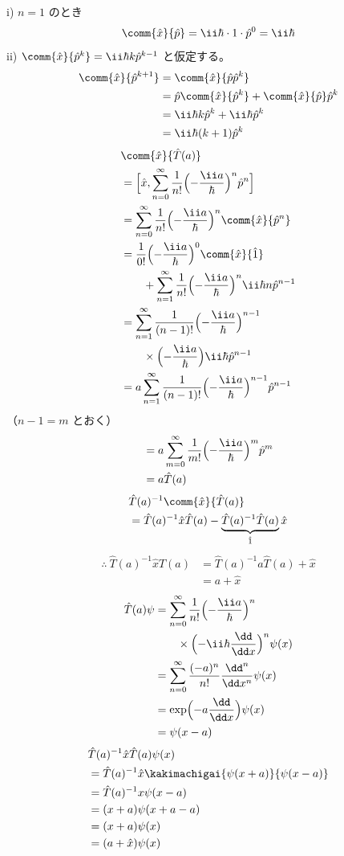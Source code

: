 i) $n=1$ のとき
\[ \comm{\hat{x}}{\hat{p}}=\ii\hbar\cdot1\cdot\hat{p}^{0}=\ii\hbar \]
ii) $\comm{\hat{x}}{\hat{p}^{k}}=\ii\hbar k\hat{p}^{k-1}$ と仮定する。
\begin{align*}
\comm{\hat{x}}{\hat{p}^{k+1}}&=\comm{\hat{x}}{\hat{p}\hat{p}^{k}}\\
&=\hat{p}\comm{\hat{x}}{\hat{p}^{k}}+\comm{\hat{x}}{\hat{p}}\hat{p}^{k}\\
&=\ii\hbar k\hat{p}^{k}+\ii\hbar\hat{p}^{k}\\
&=\ii\hbar(k+1)\hat{p}^{k}
\end{align*}
\begin{align*}
&\comm{\hat{x}}{\hat{T}(a)}\\
&=\Bigl[\hat{x},\sum_{n=0}^{\infty}\frac{1}{n!}\Bigl(-\frac{\ii a}{\hbar}\Bigr)^{n}\hat{p}^{n}\Bigr]\\
&=\sum_{n=0}^{\infty}\frac{1}{n!}\Bigl(-\frac{\ii a}{\hbar}\Bigr)^{n}\comm{\hat{x}}{\hat{p}^{n}}\\
&=\frac{1}{0!}\Bigl(-\frac{\ii a}{\hbar}\Bigr)^{0}\comm{\hat{x}}{\hat{1}}\\
&\qquad+\sum_{n=1}^{\infty}\frac{1}{n!}\Bigl(-\frac{\ii a}{\hbar}\Bigr)^{n}\ii\hbar n\hat{p}^{n-1}\\
&=\sum_{n=1}^{\infty}\frac{1}{(n-1)!}\Bigl(-\frac{\ii a}{\hbar}\Bigr)^{n-1}\\
&\qquad\times\Bigl(-\frac{\ii a}{\hbar}\Bigr)\ii\hbar\hat{p}^{n-1}\\
&=a\sum_{n=1}^{\infty}\frac{1}{(n-1)!}\Bigl(-\frac{\ii a}{\hbar}\Bigr)^{n-1}\hat{p}^{n-1}
\end{align*}
（$n-1=m$ とおく）
\begin{align*}
&=a\sum_{m=0}^{\infty}\frac{1}{m!}\Bigl(-\frac{\ii a}{\hbar}\Bigr)^{m}\hat{p}^{m}\\
&=a\hat{T}(a)
\end{align*}
\begin{align*}
&\hat{T}(a)^{-1}\comm{\hat{x}}{\hat{T}(a)}\\
&=\hat{T}(a)^{-1}\hat{x}\hat{T}(a)-\underbrace{\hat{T}(a)^{-1}\hat{T}(a)}_{\hat{1}}\hat{x}
\end{align*}
\begin{align*}
\therefore\ \hat{T}(a)^{-1}\hat{x}\hat{T}(a)&=\hat{T}(a)^{-1}a\hat{T}(a)+\hat{x}\\
&=a+\hat{x}
\end{align*}
\begin{align*}
\hat{T}(a)\psi&=\sum_{n=0}^{\infty}\frac{1}{n!}\Bigl(-\frac{\ii a}{\hbar}\Bigr)^{n}\\
&\qquad\times\Bigl(-\ii\hbar\frac{\dd}{\dd x}\Bigr)^{n}\psi(x)\\
&=\sum_{n=0}^{\infty}\frac{(-a)^{n}}{n!}\frac{\dd^{n}}{\dd x^{n}}\psi(x)\\
&=\exp\Bigl(-a\frac{\dd}{\dd x}\Bigr)\psi(x)\\
&=\psi(x-a)
\end{align*}
\begin{align*}
&\hat{T}(a)^{-1}\hat{x}\hat{T}(a)\psi(x)\\
&=\hat{T}(a)^{-1}\hat{x}\kakimachigai{\psi(x+a)}{\psi(x-a)}\\
&=\hat{T}(a)^{-1}x\psi(x-a)\\
&=(x+a)\psi(x+a-a)\\
&=(x+a)\psi(x)\\
&=(a+\hat{x})\psi(x)
\end{align*}
